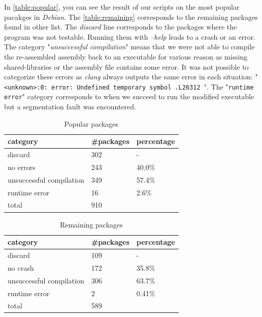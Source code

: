 \documentclass[a4paper,11pt,oneside]{report}
\begin{document}
In \autoref{table:popular}, you can see the result of our scripts on the most
popular pacakges in \textit{Debian}. The \autoref{table:remaining}
corresponds to the remaining packages found in other list. The
\textit{discard} line corresponds to the packages where the program was not
testable. Running them with \textit{--help} leads to a crash or an error. 
The category "\textit{unsuccessful compilation}" means that we were not able to
compile the re-assembled assembly back to an executable for various reason as
missing shared-libraries or the assembly file contains some error. It was not
possible to categorize these errors as \textit{clang} always outputs the same
error in each situation: "\texttt{<unknown>:0: error: Undefined temporary symbol .L26312 }".
The "\texttt{runtime error}" category corresponds to when we succeed to run
the modified executable but a segmentation fault was encountered.


\begin{table}[H]
    \centering
    \begin{tabular}{lll}
        \hline
        category                & \#packages & percentage\\
        \hline
        discard                  & 302 & - \\
        no errors                & 243 & 40.0\% \\
        unsuccessful compilation & 349 & 57.4\% \\
        runtime error            & 16  & 2.6\% \\
        \hline
        total                    & 910  \\ 
        \hline
    \end{tabular}
    \caption{Popular packages}
    \label{table:popular}
\end{table}


\begin{table}[H]
    \centering
    \begin{tabular}{lll}
        \hline
        category                & \#packages & percentage \\
        \hline
        discard                  & 109 & -  \\
        no crash                 & 172 & 35.8\% \\
        unsuccessful compilation & 306 & 63.7\% \\
        runtime error            & 2   & 0.41\% \\
        \hline
        total                    & 589  \\
        \hline
    \end{tabular}
    \caption{Remaining packages}
    \label{table:remaining}
\end{table}
\end{document}
